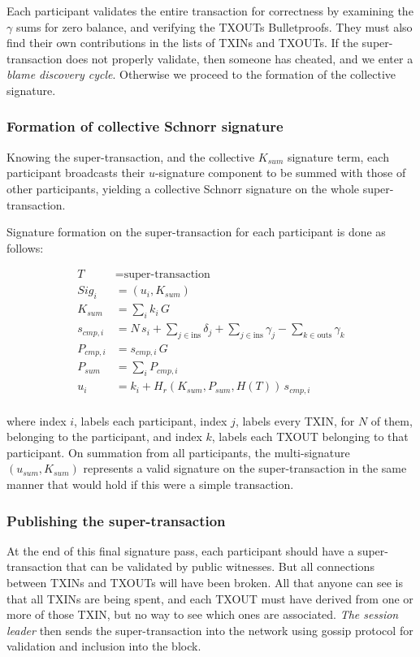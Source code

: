 \documentclass[a4paper, 10pt, conference]{ieeeconf}
\begin{document}
Each participant validates the entire transaction for correctness by examining the $\gamma$ sums for zero balance, and verifying the TXOUTs Bulletproofs. They must also find their own contributions in the lists of TXINs and TXOUTs. If the super-transaction does not properly validate, then someone has cheated, and we enter a \textit{blame discovery cycle}. Otherwise we proceed to the formation of the collective signature. 

\subsubsection{Formation of collective Schnorr signature} Knowing the super-transaction, and the collective $K_{sum}$ signature term, each participant broadcasts their $u$-signature component to be summed with those of other participants, yielding a collective Schnorr signature on the whole super-transaction.

Signature formation on the super-transaction for each participant is done as follows:

\begin{align*}
T &= \text{super-transaction} \\
Sig_i &= (u_i, K_{sum}) \\
K_{sum} &= \sum_i{k_i \, G} \\
s_{cmp,i} &= N \, s_i + \sum_{j \in \text{ins}} {\delta_j} + \sum_{j \in \text{ins}} {\gamma_j} - \sum_{k \in \text{outs}} {\gamma_k} \\
P_{cmp,i} &= s_{cmp,i} \, G \\
P_{sum} &= \sum_i{P_{cmp,i}}\\
u_i &= k_i + H_r(K_{sum} , P_{sum},  H(T)) \,  s_{cmp,i}\\
\end{align*}

where index $i$, labels each participant, index $j$, labels every TXIN, for $N$ of them, belonging to the participant, and index $k$, labels each TXOUT belonging to that participant. On summation from all participants, the multi-signature $(u_{sum}, K_{sum})$ represents a valid signature on the super-transaction in the same manner that would hold if this were a simple transaction.

\subsubsection{Publishing the super-transaction} At the end of this final signature pass, each participant should have a super-transaction that can be validated by public witnesses. But all connections between TXINs and TXOUTs will have been broken. All that anyone can see is that all TXINs are being spent, and each TXOUT must have derived from one or more of those TXIN, but no way to see which ones are associated. \textit{The session leader} then sends the super-transaction into the network using gossip protocol for validation and inclusion into the block.
\end{document}

